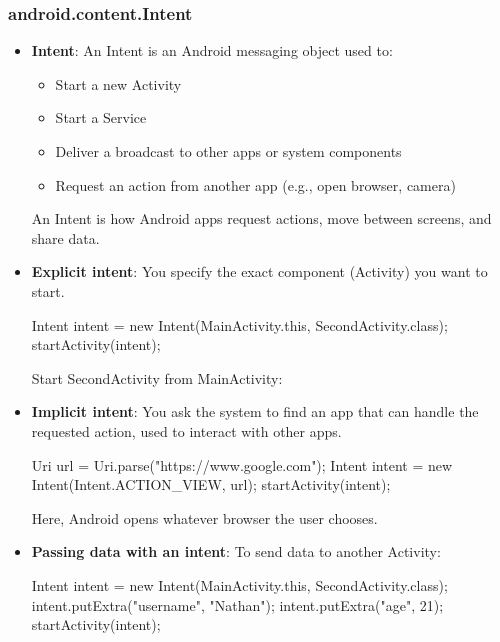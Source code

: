 \documentclass{report}
\begin{document}
    \subsubsection{android.content.Intent}
    \begin{itemize}
        \item \textbf{Intent}: An Intent is an Android messaging object used to: 
            \begin{itemize}
                \item Start a new Activity
                \item Start a Service
                \item Deliver a broadcast to other apps or system components
                \item Request an action from another app (e.g., open browser, camera)
            \end{itemize}
            An Intent is how Android apps request actions, move between screens, and share data.
        \item \textbf{Explicit intent}: You specify the exact component (Activity) you want to start.
            \bigbreak \noindent 
            \begin{javacode}
                Intent intent = new Intent(MainActivity.this, SecondActivity.class);
                startActivity(intent);
            \end{javacode}
            \bigbreak \noindent 
            Start SecondActivity from MainActivity:
        \item \textbf{Implicit intent}: You ask the system to find an app that can handle the requested action, used to interact with other apps.
            \bigbreak \noindent 
            \begin{javacode}
                Uri url = Uri.parse("https://www.google.com");
                Intent intent = new Intent(Intent.ACTION_VIEW, url);
                startActivity(intent);
            \end{javacode}
            \bigbreak \noindent 
            Here, Android opens whatever browser the user chooses.
        \item \textbf{Passing data with an intent}: To send data to another Activity:
            \bigbreak \noindent 
            \begin{javacode}
                Intent intent = new Intent(MainActivity.this, SecondActivity.class);
                intent.putExtra("username", "Nathan");
                intent.putExtra("age", 21);
                startActivity(intent);

\end{javacode}
\end{itemize}
\end{document}
